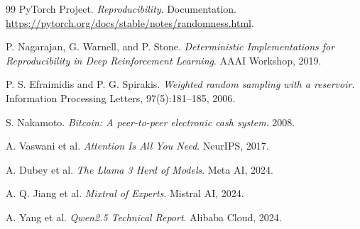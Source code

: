 \documentclass[10pt]{article}
\begin{document}
\begin{thebibliography}{99}
 PyTorch Project. \emph{Reproducibility}. Documentation. \url{https://pytorch.org/docs/stable/notes/randomness.html}.

 P. Nagarajan, G. Warnell, and P. Stone. \emph{Deterministic Implementations for Reproducibility in Deep Reinforcement Learning}. AAAI Workshop, 2019.

 P. S. Efraimidis and P. G. Spirakis. \emph{Weighted random sampling with a reservoir}. Information Processing Letters, 97(5):181--185, 2006.

 S. Nakamoto. \emph{Bitcoin: A peer-to-peer electronic cash system}. 2008.

 A. Vaswani et al. \emph{Attention Is All You Need}. NeurIPS, 2017.

 A. Dubey et al. \emph{The Llama 3 Herd of Models}. Meta AI, 2024.

 A. Q. Jiang et al. \emph{Mixtral of Experts}. Mistral AI, 2024.

 A. Yang et al. \emph{Qwen2.5 Technical Report}. Alibaba Cloud, 2024.

\end{thebibliography}
\end{document}
